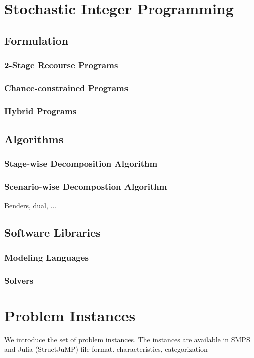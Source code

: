 \section{Stochastic Integer Programming}

\subsection{Formulation}
\subsubsection{2-Stage Recourse Programs}
\subsubsection{Chance-constrained Programs}
\subsubsection{Hybrid Programs}


\subsection{Algorithms}
\subsubsection{Stage-wise Decomposition Algorithm}
\subsubsection{Scenario-wise Decompostion Algorithm}
Benders, dual, ...

\subsection{Software Libraries}
\subsubsection{Modeling Languages}
\subsubsection{Solvers}

\section{Problem Instances}

We introduce the set of problem instances. The instances are available in SMPS and Julia (StructJuMP) file format. characteristics, categorization
